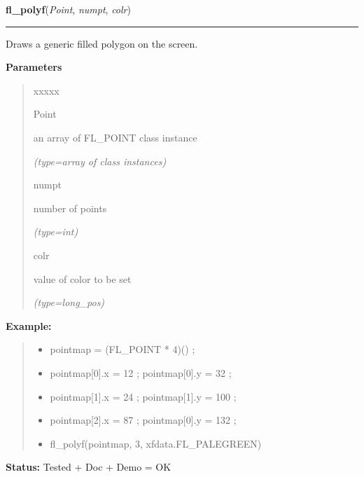 \hspace{.8\funcindent}\begin{boxedminipage}{\funcwidth}

    \raggedright \textbf{fl\_polyf}(\textit{Point}, \textit{numpt}, \textit{colr})

    \vspace{-1.5ex}

    \rule{\textwidth}{0.5\fboxrule}
\setlength{\parskip}{2ex}
    Draws a generic filled polygon on the screen.

\setlength{\parskip}{1ex}
      \textbf{Parameters}
      \vspace{-1ex}

      \begin{quote}
        \begin{Ventry}{xxxxx}

          \item[Point]

          an array of FL\_POINT class instance

            {\it (type=array of class instances)}

          \item[numpt]

          number of points

            {\it (type=int)}

          \item[colr]

          value of color to be set

            {\it (type=long\_pos)}

        \end{Ventry}

      \end{quote}

\textbf{Example:}
\begin{quote}
  \begin{itemize}

  \item
    \setlength{\parskip}{0.6ex}
pointmap = (FL\_POINT * 4)() ;



  \item pointmap[0].x = 12 ; pointmap[0].y = 32 ;



  \item pointmap[1].x = 24 ; pointmap[1].y = 100 ;



  \item pointmap[2].x = 87 ; pointmap[0].y = 132 ;



  \item fl\_polyf(pointmap, 3, xfdata.FL\_PALEGREEN)



\end{itemize}

\end{quote}

\textbf{Status:} Tested + Doc + Demo = OK



    \end{boxedminipage}

